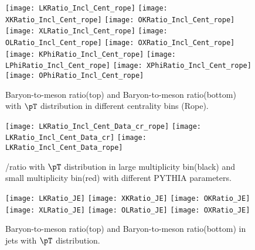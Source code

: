 \begin{figure}[ht]
        \begin{center}
                \texttt{[image: LKRatio\_Incl\_Cent\_rope]}
                \texttt{[image: XKRatio\_Incl\_Cent\_rope]}
                \texttt{[image: OKRatio\_Incl\_Cent\_rope]}
                \texttt{[image: XLRatio\_Incl\_Cent\_rope]}
                \texttt{[image: OLRatio\_Incl\_Cent\_rope]}
                \texttt{[image: OXRatio\_Incl\_Cent\_rope]}
                \texttt{[image: KPhiRatio\_Incl\_Cent\_rope]}
                \texttt{[image: LPhiRatio\_Incl\_Cent\_rope]}
                \texttt{[image: XPhiRatio\_Incl\_Cent\_rope]}
                \texttt{[image: OPhiRatio\_Incl\_Cent\_rope]}
        \end{center}
	\caption{Baryon-to-meson ratio(top) and Baryon-to-meson ratio(bottom) with $\pT$ distribution in different centrality bins (Rope).}
        \label{fig:InclParRatioCentrope}
\end{figure}

\begin{figure}[ht]
        \begin{center}
                \texttt{[image: LKRatio\_Incl\_Cent\_Data\_cr\_rope]}
                \texttt{[image: LKRatio\_Incl\_Cent\_Data\_cr]}
                \texttt{[image: LKRatio\_Incl\_Cent\_Data\_rope]}
        \end{center}
	\caption{\lmb/\kzero ratio with $\pT$ distribution in large multiplicity bin(black) and small multiplicity bin(red) with different PYTHIA parameters.}
        \label{fig:InclParRatioCent}
\end{figure}

\begin{figure}[ht]
        \begin{center}
                \texttt{[image: LKRatio\_JE]}
                \texttt{[image: XKRatio\_JE]}
                \texttt{[image: OKRatio\_JE]}
                \texttt{[image: XLRatio\_JE]}
                \texttt{[image: OLRatio\_JE]}
                \texttt{[image: OXRatio\_JE]}
        \end{center}
        \caption{Baryon-to-meson ratio(top) and Baryon-to-meson ratio(bottom) in jets with $\pT$ distribution.}
        \label{fig:JEParRatio}
\end{figure}

